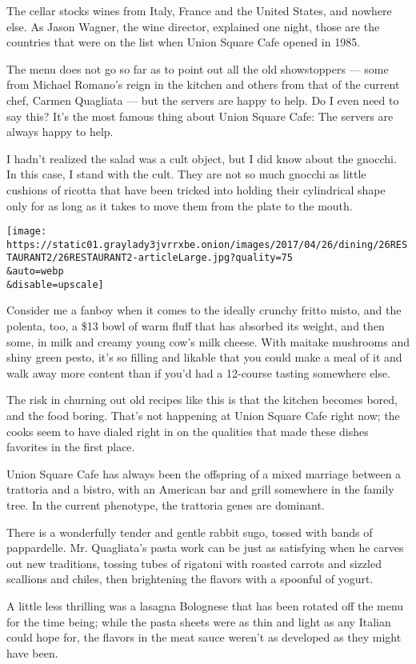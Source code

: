The cellar stocks wines from Italy, France and the United States, and
nowhere else. As Jason Wagner, the wine director, explained one night,
those are the countries that were on the list when Union Square Cafe
opened in 1985.

The menu does not go so far as to point out all the old showstoppers ---
some from Michael Romano's reign in the kitchen and others from that of
the current chef, Carmen Quagliata --- but the servers are happy to
help. Do I even need to say this? It's the most famous thing about Union
Square Cafe: The servers are always happy to help.

I hadn't realized the salad was a cult object, but I did know about the
gnocchi. In this case, I stand with the cult. They are not so much
gnocchi as little cushions of ricotta that have been tricked into
holding their cylindrical shape only for as long as it takes to move
them from the plate to the mouth.

\texttt{[image: https://static01.graylady3jvrrxbe.onion/images/2017/04/26/dining/26RESTAURANT2/26RESTAURANT2-articleLarge.jpg?quality=75\\\&auto=webp\\\&disable=upscale]}

Consider me a fanboy when it comes to the ideally crunchy fritto misto,
and the polenta, too, a \$13 bowl of warm fluff that has absorbed its
weight, and then some, in milk and creamy young cow's milk cheese. With
maitake mushrooms and shiny green pesto, it's so filling and likable
that you could make a meal of it and walk away more content than if
you'd had a 12-course tasting somewhere else.

The risk in churning out old recipes like this is that the kitchen
becomes bored, and the food boring. That's not happening at Union Square
Cafe right now; the cooks seem to have dialed right in on the qualities
that made these dishes favorites in the first place.

Union Square Cafe has always been the offspring of a mixed marriage
between a trattoria and a bistro, with an American bar and grill
somewhere in the family tree. In the current phenotype, the trattoria
genes are dominant.

There is a wonderfully tender and gentle rabbit sugo, tossed with bands
of pappardelle. Mr. Quagliata's pasta work can be just as satisfying
when he carves out new traditions, tossing tubes of rigatoni with
roasted carrots and sizzled scallions and chiles, then brightening the
flavors with a spoonful of yogurt.

A little less thrilling was a lasagna Bolognese that has been rotated
off the menu for the time being; while the pasta sheets were as thin and
light as any Italian could hope for, the flavors in the meat sauce
weren't as developed as they might have been.

